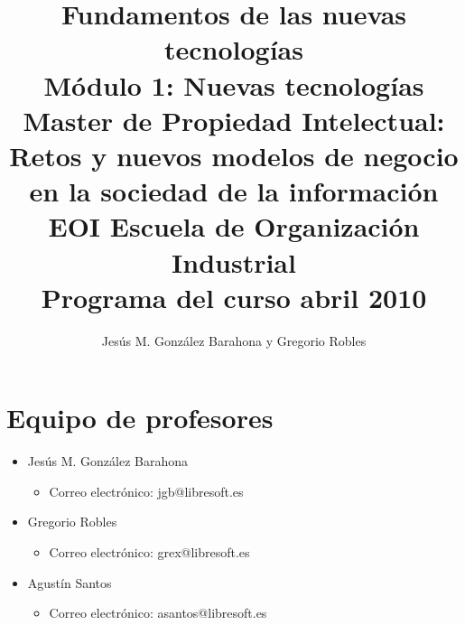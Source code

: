 \documentclass[a4paper,12pt]{article}
\title{Fundamentos de las nuevas tecnologías \\
Módulo 1: Nuevas tecnologías \\
Master de Propiedad Intelectual: \\
Retos y nuevos modelos de negocio en la sociedad de la información \\
EOI Escuela de Organización Industrial \\
Programa del curso abril 2010}
\author{Jesús M. González Barahona y Gregorio Robles}
\begin{document}
\maketitle

\newpage

\tableofcontents

\newpage

\section{Equipo de profesores}

\begin{itemize}
\item Jesús M. González Barahona
  \begin{itemize}
  \item Correo electrónico: jgb@libresoft.es
  \end{itemize}
\item Gregorio Robles
  \begin{itemize}
  \item Correo electrónico: grex@libresoft.es
  \end{itemize}
\item Agustín Santos
  \begin{itemize}
  \item Correo electrónico: asantos@libresoft.es
  \end{itemize}
\end{itemize}





\end{document}
